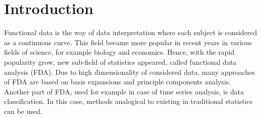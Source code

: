 \documentclass[energies,article,submit,pdftex,moreauthors]{Definitions/mdpi}
\begin{document}




\section{Introduction}

Functional data is the way of data interpretation where each subject is considered as a continuous curve. This field became more popular in recent years in various fields of science, for example biology and economics. Hence, with the rapid popularity grow, new sub-field of statistics appeared, called functional data analysis (FDA). Due to high dimensionality of considered data, many approaches of FDA are based on basis expansions and principle components analysis. Another part of FDA, used for example in case of time series analysis, is data classification. In this case, methods analogical to existing in traditional statistics can be used. 
\end{document}
